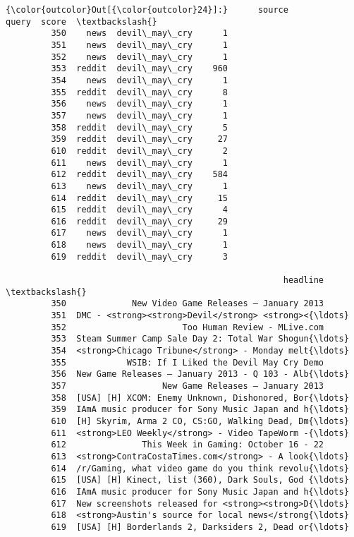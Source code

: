 \documentclass[11pt]{article}
\begin{document}
\begin{Verbatim}[commandchars=\\\{\}]
{\color{outcolor}Out[{\color{outcolor}24}]:}      source          query  score  \textbackslash{}
         350    news  devil\_may\_cry      1   
         351    news  devil\_may\_cry      1   
         352    news  devil\_may\_cry      1   
         353  reddit  devil\_may\_cry    960   
         354    news  devil\_may\_cry      1   
         355  reddit  devil\_may\_cry      8   
         356    news  devil\_may\_cry      1   
         357    news  devil\_may\_cry      1   
         358  reddit  devil\_may\_cry      5   
         359  reddit  devil\_may\_cry     27   
         610  reddit  devil\_may\_cry      2   
         611    news  devil\_may\_cry      1   
         612  reddit  devil\_may\_cry    584   
         613    news  devil\_may\_cry      1   
         614  reddit  devil\_may\_cry     15   
         615  reddit  devil\_may\_cry      4   
         616  reddit  devil\_may\_cry     29   
         617    news  devil\_may\_cry      1   
         618    news  devil\_may\_cry      1   
         619  reddit  devil\_may\_cry      3   
         
                                                       headline  \textbackslash{}
         350             New Video Game Releases – January 2013   
         351  DMC - <strong><strong>Devil</strong> <strong><{\ldots}   
         352                       Too Human Review - MLive.com   
         353  Steam Summer Camp Sale Day 2: Total War Shogun{\ldots}   
         354  <strong>Chicago Tribune</strong> - Monday melt{\ldots}   
         355            WSIB: If I Liked the Devil May Cry Demo   
         356  New Game Releases – January 2013 - Q 103 - Alb{\ldots}   
         357                   New Game Releases – January 2013   
         358  [USA] [H] XCOM: Enemy Unknown, Dishonored, Bor{\ldots}   
         359  IAmA music producer for Sony Music Japan and h{\ldots}   
         610  [H] Skyrim, Arma 2 CO, CS:GO, Walking Dead, Dm{\ldots}   
         611  <strong>LEO Weekly</strong> - Video TapeWorm -{\ldots}   
         612               This Week in Gaming: October 16 - 22   
         613  <strong>ContraCostaTimes.com</strong> - A look{\ldots}   
         614  /r/Gaming, what video game do you think revolu{\ldots}   
         615  [USA] [H] Kinect, list (360), Dark Souls, God {\ldots}   
         616  IAmA music producer for Sony Music Japan and h{\ldots}   
         617  New screenshots released for <strong><strong>D{\ldots}   
         618  <strong>Austin's source for local news</strong{\ldots}   
         619  [USA] [H] Borderlands 2, Darksiders 2, Dead or{\ldots}   
         

\end{Verbatim}
\end{document}
